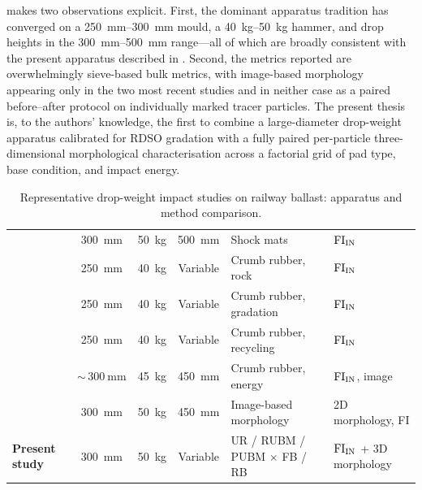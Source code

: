  makes two observations explicit. First, the dominant apparatus tradition has converged on a \qtyrange{250}{300}{\mm} mould, a \qtyrange{40}{50}{\kg} hammer, and drop heights in the \qtyrange{300}{500}{\mm} range---all of which are broadly consistent with the present apparatus described in . Second, the metrics reported are overwhelmingly sieve-based bulk metrics, with image-based morphology appearing only in the two most recent studies and in neither case as a paired before--after protocol on individually marked tracer particles. The present thesis is, to the authors' knowledge, the first to combine a large-diameter drop-weight apparatus calibrated for RDSO gradation with a fully paired per-particle three-dimensional morphological characterisation across a factorial grid of pad type, base condition, and impact energy.

\begin{table}[htbp]
  \centering
  \caption[Representative drop-weight impact studies on ballast]{Representative drop-weight impact studies on railway ballast: apparatus and method comparison.}
  \label{tab:impact-studies}
  \small
  \renewcommand{\arraystretch}{1.3}
  \begin{tabularx}{\textwidth}{@{}>{\raggedright\arraybackslash}p{} c c c L L@{}}
    \toprule
     &  &  &  &  & \\
    \midrule
    \citet{nimbalkar2012}   & \qty{300}{\mm}  & \qty{50}{\kg} & \qty{500}{\mm} & Shock mats         & $\mathrm{FI}_{\mathrm{IN}}$\\
    \citet{koohmishi2020}   & \qty{250}{\mm}  & \qty{40}{\kg} & Variable       & Crumb rubber, rock & $\mathrm{FI}_{\mathrm{IN}}$\\
    \citet{koohmishi2021}   & \qty{250}{\mm}  & \qty{40}{\kg} & Variable       & Crumb rubber, gradation & $\mathrm{FI}_{\mathrm{IN}}$\\
    \citet{koohmishi2022}   & \qty{250}{\mm}  & \qty{40}{\kg} & Variable       & Crumb rubber, recycling & $\mathrm{FI}_{\mathrm{IN}}$\\
    \citet{zhang2023}       & ${\sim}\,\qty{300}{\mm}$ & \qty{45}{\kg} & \qty{450}{\mm} & Crumb rubber, energy & $\mathrm{FI}_{\mathrm{IN}}$, image\\
    \citet{ferreira2023}    & \qty{300}{\mm}  & \qty{50}{\kg} & \qty{450}{\mm} & Image-based morphology & 2D morphology, FI\\
    \textbf{Present study}  & \qty{300}{\mm}  & \qty{50}{\kg} & Variable       & UR / RUBM / PUBM $\times$ FB / RB & $\mathrm{FI}_{\mathrm{IN}}$ + 3D morphology\\
    \bottomrule
  \end{tabularx}
\end{table}

